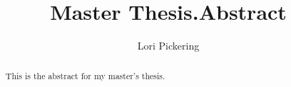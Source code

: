 \documentclass[12pt]{report}
\begin{document}
\title{Master Thesis.Abstract}
\author{Lori Pickering}
\begin{abstract}
This is the abstract for my master's thesis.
\end{abstract}
\end{document}
